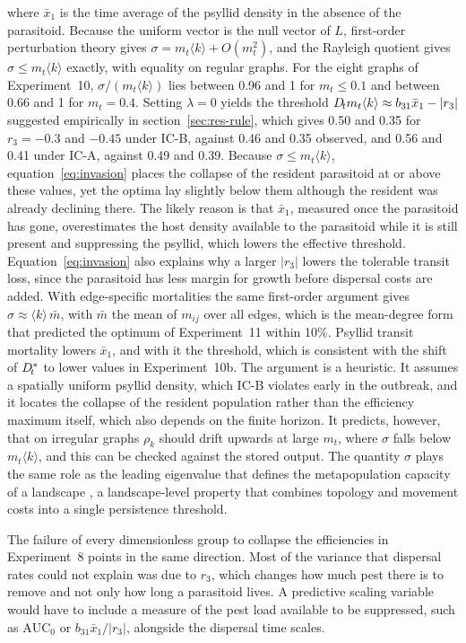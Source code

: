 where $\bar{x}_1$ is the time average of the psyllid density in the absence of the parasitoid. Because the uniform vector is the null vector of $L$, first-order perturbation theory gives $\sigma = m_t\langle k\rangle + O(m_t^2)$, and the Rayleigh quotient gives $\sigma \le m_t\langle k\rangle$ exactly, with equality on regular graphs. For the eight graphs of Experiment~10, $\sigma/(m_t\langle k\rangle)$ lies between 0.96 and 1 for $m_t \le 0.1$ and between 0.66 and 1 for $m_t = 0.4$. Setting $\lambda = 0$ yields the threshold $D_{\!t} m_t \langle k\rangle \approx b_{31}\bar{x}_1 - |r_3|$ suggested empirically in section~\ref{sec:res-rule}, which gives 0.50 and 0.35 for $r_3 = -0.3$ and $-0.45$ under IC-B, against 0.46 and 0.35 observed, and 0.56 and 0.41 under IC-A, against 0.49 and 0.39. Because $\sigma \le m_t\langle k\rangle$, equation~\eqref{eq:invasion} places the collapse of the resident parasitoid at or above these values, yet the optima lay slightly below them although the resident was already declining there. The likely reason is that $\bar{x}_1$, measured once the parasitoid has gone, overestimates the host density available to the parasitoid while it is still present and suppressing the psyllid, which lowers the effective threshold. Equation~\eqref{eq:invasion} also explains why a larger $|r_3|$ lowers the tolerable transit loss, since the parasitoid has less margin for growth before dispersal costs are added. With edge-specific mortalities the same first-order argument gives $\sigma \approx \langle k\rangle\,\bar{m}$, with $\bar{m}$ the mean of $m_{ij}$ over all edges, which is the mean-degree form that predicted the optimum of Experiment~11 within 10\%. Psyllid transit mortality lowers $\bar{x}_1$, and with it the threshold, which is consistent with the shift of $D_{\!t}^*$ to lower values in Experiment~10b. The argument is a heuristic. It assumes a spatially uniform psyllid density, which IC-B violates early in the outbreak, and it locates the collapse of the resident population rather than the efficiency maximum itself, which also depends on the finite horizon. It predicts, however, that on irregular graphs $\rho_k$ should drift upwards at large $m_t$, where $\sigma$ falls below $m_t\langle k\rangle$, and this can be checked against the stored output. The quantity $\sigma$ plays the same role as the leading eigenvalue that defines the metapopulation capacity of a landscape \citep{hanski2000}, a landscape-level property that combines topology and movement costs into a single persistence threshold.

The failure of every dimensionless group to collapse the efficiencies in Experiment~8 points in the same direction. Most of the variance that dispersal rates could not explain was due to $r_3$, which changes how much pest there is to remove and not only how long a parasitoid lives. A predictive scaling variable would have to include a measure of the pest load available to be suppressed, such as $\mathrm{AUC}_0$ or $b_{31}\bar{x}_1/|r_3|$, alongside the dispersal time scales.

